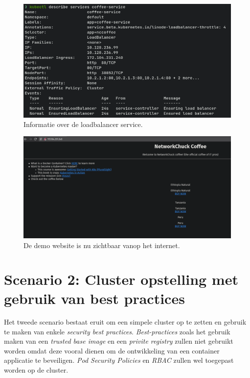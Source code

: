 \begin{figure}[h]
	\centering
	\includegraphics[width=\linewidth]{img/kubectlDescriveService1.png}
	\caption{Informatie over de loadbalancer service.}
	\label{fig:kubectlDescriveService1}
\end{figure}

\begin{figure}[h]
	\centering
	\includegraphics[width=\linewidth]{img/demoSite1.png}
	\caption{De demo website is nu zichtbaar vanop het internet.}
	\label{fig:demoSite1}
\end{figure}

\clearpage
\section{Scenario 2: Cluster opstelling met gebruik van best practices}
Het tweede scenario bestaat eruit om een simpele cluster op te zetten en gebruik te maken van enkele \textit{security best practices}. \textit{Best-practices} zoals het gebruik maken van een \textit{trusted base image} en een \textit{privite registry} zullen niet gebruikt worden omdat deze vooral dienen om de ontwikkeling van een container applicatie te beveiligen. \textit{Pod Security Policies} en \textit{RBAC} zullen wel toegepast worden op de cluster. 

